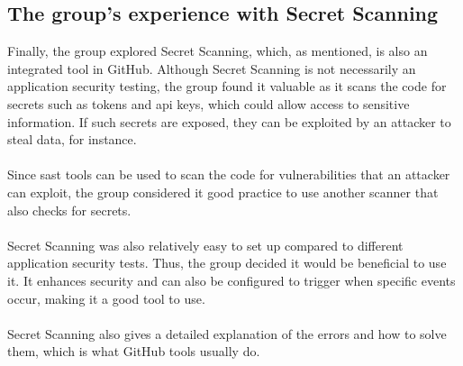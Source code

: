 \subsection{The group's experience with Secret Scanning}
Finally, the group explored Secret Scanning, which, as mentioned, is also an integrated tool in GitHub. Although Secret Scanning is not necessarily an application security testing, the group found it valuable as it scans the code for secrets such as tokens and \acrshort{api} keys, which could allow access to sensitive information. If such secrets are exposed, they can be exploited by an attacker to steal data, for instance. 
\\~\\
Since \acrshort{sast} tools can be used to scan the code for vulnerabilities that an attacker can exploit, the group considered it good practice to use another scanner that also checks for secrets. 
\\~\\
Secret Scanning was also relatively easy to set up compared to different application security tests. Thus, the group decided it would be beneficial to use it. It enhances security and can also be configured to trigger when specific events occur, making it a good tool to use. 
\\~\\
Secret Scanning also gives a detailed explanation of the errors and how to solve them, which is what GitHub tools usually do. 

